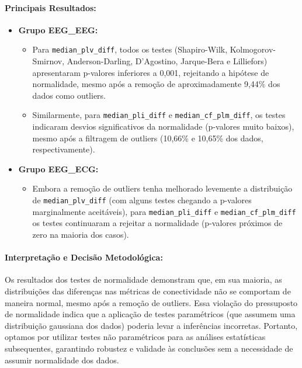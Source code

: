 \paragraph{Principais Resultados:}
\begin{itemize}
    \item \textbf{Grupo EEG\_EEG:}
    \begin{itemize}
        \item Para \texttt{median\_plv\_diff}, todos os testes (Shapiro-Wilk, Kolmogorov-Smirnov, Anderson-Darling, D'Agostino, Jarque-Bera e Lilliefors) apresentaram p-valores inferiores a 0,001, rejeitando a hipótese de normalidade, mesmo após a remoção de aproximadamente 9,44\% dos dados como outliers.
        \item Similarmente, para \texttt{median\_pli\_diff} e \texttt{median\_cf\_plm\_diff}, os testes indicaram desvios significativos da normalidade (p-valores muito baixos), mesmo após a filtragem de outliers (10,66\% e 10,65\% dos dados, respectivamente).
    \end{itemize}
    \item \textbf{Grupo EEG\_ECG:}
    \begin{itemize}
        \item Embora a remoção de outliers tenha melhorado levemente a distribuição de \texttt{median\_plv\_diff} (com alguns testes chegando a p-valores marginalmente aceitáveis), para \texttt{median\_pli\_diff} e \texttt{median\_cf\_plm\_diff} os testes continuaram a rejeitar a normalidade (p-valores próximos de zero na maioria dos casos).
    \end{itemize}
\end{itemize}

\paragraph{Interpretação e Decisão Metodológica:}  
Os resultados dos testes de normalidade demonstram que, em sua maioria, as distribuições das diferenças nas métricas de conectividade não se comportam de maneira normal, mesmo após a remoção de outliers. Essa violação do pressuposto de normalidade indica que a aplicação de testes paramétricos (que assumem uma distribuição gaussiana dos dados) poderia levar a inferências incorretas. Portanto, optamos por utilizar testes não paramétricos para as análises estatísticas subsequentes, garantindo robustez e validade às conclusões sem a necessidade de assumir normalidade dos dados.
